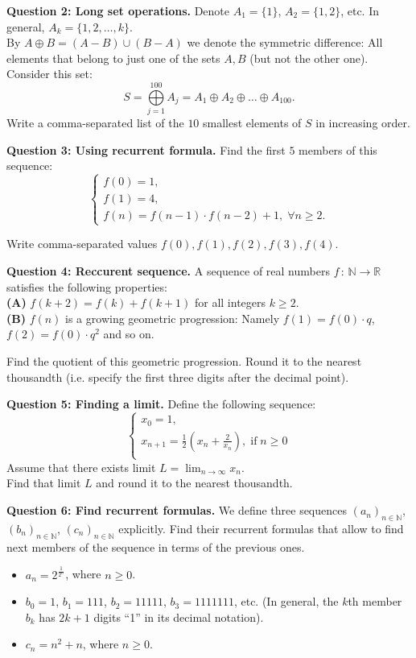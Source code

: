 \documentclass[jou]{apa6}
\begin{document}
\vspace{6pt}
{\bf Question 2: Long set operations.} Denote $A_1 = \{ 1 \}$, $A_2 = \{ 1,2 \}$, etc. 
In general, $A_k = \{ 1,2,\ldots,k\}$.\\ 
By $A \oplus B = (A - B) \cup (B-A)$
we denote the symmetric difference: All elements that belong to just one of the
sets $A,B$ (but not the other one). 
Consider this set:
$$S = \bigoplus\limits_{j=1}^{100} A_j = A_1 \oplus A_2 \oplus \ldots \oplus A_{100}.$$
Write a comma-separated list of the $10$ smallest elements of $S$ in 
increasing order.

\vspace{6pt}
{\bf Question 3: Using recurrent formula.}
Find the first $5$ members of this sequence: 
$$\left\{ \begin{array}{l} 
f(0) = 1,\\
f(1) = 4,\\
f(n) = f(n - 1) \cdot f(n - 2) + 1,\; \forall n \geq 2.
\end{array} \right.$$

Write comma-separated values $f(0),f(1),f(2),f(3),f(4)$.

\vspace{6pt}
{\bf Question 4: Reccurent sequence.} A sequence of real numbers 
$f\,:\,\mathbb{N} \rightarrow \mathbb{R}$ satisfies 
the following properties:\\
{\bf (A)} $f(k+2) = f(k) + f(k+1)$ for all integers $k \geq 2$.\\
{\bf (B)} $f(n)$ is a growing geometric progression: Namely $f(1) = f(0) \cdot q$, 
$f(2) = f(0) \cdot q^2$ and so on.


Find the quotient of this geometric progression. Round it to 
the nearest thousandth (i.e. specify the first three digits after the decimal point). 

\vspace{6pt}
{\bf Question 5: Finding a limit.} Define the following sequence: 
$$\left\{ \begin{array}{l} 
x_0 = 1,\\
x_{n+1} = \frac{1}{2} \left( x_n + \frac{2}{x_n}\right),\;\text{if}\;n\geq 0\\
\end{array} \right.$$
Assume that there exists limit $L = \lim_{n \rightarrow \infty} x_n$.\\
Find that limit $L$ and round it to 
the nearest thousandth. 

\vspace{6pt}
{\bf Question 6: Find recurrent formulas.} 
We define three sequences $(a_n)_{n \in \mathbb{N}}$, 
$(b_n)_{n \in \mathbb{N}}$, $(c_n)_{n \in \mathbb{N}}$ explicitly. 
Find their recurrent formulas that allow to find next members of the 
sequence in terms of the previous ones.
\begin{itemize}
\item ${\displaystyle a_n = 2^{\frac{1}{2^n}}}$, where $n \geq 0$. 
\item $b_0 = 1$, $b_1 = 111$, $b_2 = 11111$, $b_3 = 1111111$, etc. 
(In general, the $k$th member $b_k$ has $2k+1$ digits ``1'' in its decimal notation). 
\item $c_n = n^2 + n$, where $n \geq 0$. 
\end{itemize}
\end{document}

